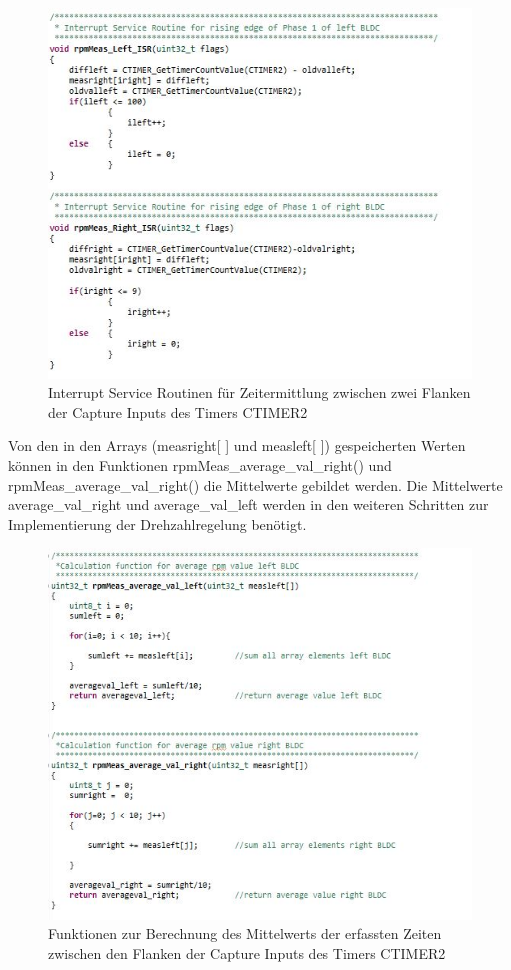 \begin{figure}[H] %
\includegraphics[width=.8\textwidth]{sec4/images/isr} 
\centering
\captionsetup{width=.95\textwidth}
\caption[Interrupt Service Routinen für Zeitermittlung zwischen zwei Capture-Flanken]{Interrupt Service Routinen für Zeitermittlung zwischen zwei Flanken der Capture Inputs des Timers CTIMER2}\centering
\label{fig:isr}
\end{figure}

\newpage
Von den in den Arrays (\glqq{}measright[ ]\grqq{} und \glqq{}measleft[ ]\grqq{}) gespeicherten Werten können in den Funktionen \glqq{}rpmMeas\_average\_val\_right()\grqq{} und \glqq{}rpmMeas\_average\_val\_right()\grqq{} die Mittelwerte gebildet werden. Die Mittelwerte \glqq{}average\_val\_right\grqq{} und \glqq{}average\_val\_left\grqq{} werden in den weiteren Schritten zur Implementierung der Drehzahlregelung benötigt. 

\begin{figure}[H] %
\includegraphics[width=.8\textwidth]{sec4/images/calculation} 
\centering
\captionsetup{width=.95\textwidth}
\caption[Funktionen zur Berechnung des Mittelwerts der Zeiten zwischen den Capture-Flanken]{Funktionen zur Berechnung des Mittelwerts der erfassten Zeiten zwischen den Flanken der Capture Inputs des Timers CTIMER2}\centering
\label{fig:calculation}
\end{figure}

